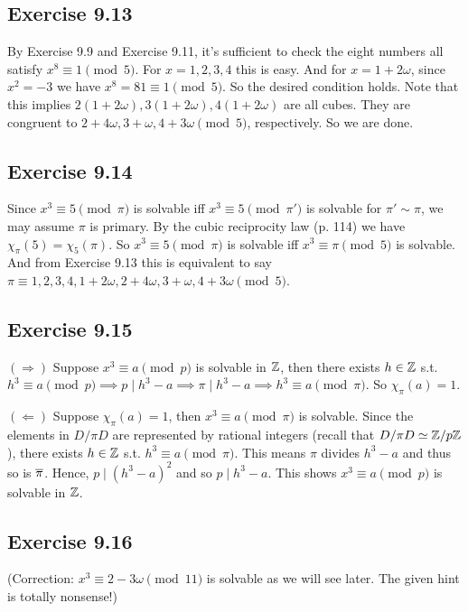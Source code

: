 \documentclass[../I&R.tex]{subfiles}
\begin{document}
\subsection*{Exercise 9.13}

By Exercise 9.9 and Exercise 9.11, it's sufficient to check the eight numbers all satisfy $x^8\equiv1\pmod{5}$. For $x=1,2,3,4$ this is easy. And for $x=1+2\omega$, since $x^2=-3$ we have $x^8=81\equiv1\pmod{5}$. So the desired condition holds. Note that this implies $2(1+2\omega),3(1+2\omega),4(1+2\omega)$ are all cubes. They are congruent to $2+4\omega,3+\omega,4+3\omega \pmod{5}$, respectively. So we are done.

\subsection*{Exercise 9.14}

Since $x^3\equiv5\pmod{\pi}$ is solvable iff $x^3\equiv5\pmod{\pi'}$ is solvable for $\pi'\sim\pi$, we may assume $\pi$ is primary. By the cubic reciprocity law (p. 114) we have $\chi_\pi(5)=\chi_5(\pi)$. So $x^3\equiv5\pmod{\pi}$ is solvable iff $x^3\equiv\pi\pmod{5}$ is solvable. And from Exercise 9.13 this is equivalent to say $\pi\equiv1,2,3,4,1+2\omega,2+4\omega,3+\omega,4+3\omega \pmod{5}$.

\subsection*{Exercise 9.15}

$(\Rightarrow)$ Suppose $x^3\equiv a\pmod{p}$ is solvable in $\mathbb{Z}$, then there exists $h\in\mathbb{Z}$ s.t. $h^3\equiv a\pmod{p} \implies p\mid h^3-a \implies \pi\mid h^3-a \implies h^3\equiv a\pmod{\pi}$. So $\chi_\pi(a)=1$.

$(\Leftarrow)$ Suppose $\chi_\pi(a)=1$, then $x^3\equiv a\pmod{\pi}$ is solvable. Since the elements in $D/\pi D$ are represented by rational integers (recall that $D/\pi D\simeq \mathbb{Z}/p\mathbb{Z}$), there exists $h\in\mathbb{Z}$ s.t. $h^3\equiv a\pmod{\pi}$. This means $\pi$ divides $h^3-a$ and thus so is $\overline{\pi}$. Hence, $p\mid (h^3-a)^2$ and so $p\mid h^3-a$. This shows $x^3\equiv a\pmod{p}$ is solvable in $\mathbb{Z}$.

\subsection*{Exercise 9.16}

(Correction: $x^3\equiv2-3\omega\pmod{11}$ {\color{red}is} solvable as we will see later. The given hint is totally nonsense!)
\end{document}
